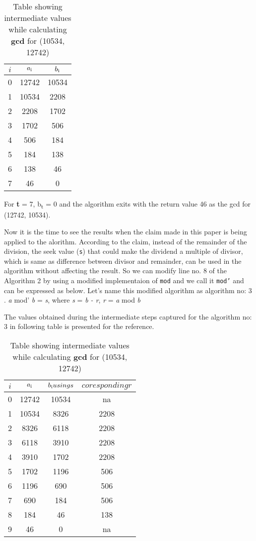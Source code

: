 \documentclass[12pt]{article}
\begin{document}
\begin{table}[h!]
\centering
	\begin{tabular}{c | c | c}
		\hline
		$i$ & $a\textsubscript{i}$ & $b\textsubscript{i}$ \\ [0.5ex] 
		\hline
		0 & 12742 & 10534 \\ 
		1 & 10534 & 2208 \\  
		2 & 2208  & 1702 \\
		3 & 1702  & 506 \\
		4 & 506   & 184 \\
		5 & 184   & 138 \\
		6 & 138   & 46 \\
		7 & 46    & 0
	\end{tabular}
\caption{Table showing intermediate values while calculating \textbf{gcd} for (10534, 12742)}
\label{table:2}
\end{table}

For \textbf{t} = 7, b\textsubscript{t} = 0 and the algorithm exits with the return value 
46 as the gcd for (12742, 10534).

Now it is the time to see the results when the claim made in this paper is being applied 
to the alorithm. According to the claim, instead of the remainder of the division, the seek value (\texttt{s}) that could make the dividend a multiple of divisor, which is same as difference between divisor and remainder, can be used in the algorithm without affecting the result. So we can modify line no. 8 of the Algorithm 2 by using a modified implementaion of \texttt{mod} and we call it \texttt{mod'} and can be expressed as below. Let's name this modified algorithm as algorithm no: 3 .  \linebreak
\textit{a} mod' \textit{b} = \textit{s}, where  \textit{s} = \textit{b - r}, \textit{r} = \textit{a} mod \textit{b}

The values obtained during the intermediate steps captured for the algorithm no: 3 in following table is presented for the reference.

\begin{table}[h!]
\centering
	\begin{tabular}{c | c | c | c}
		\hline
		$i$ & $a\textsubscript{i}$ & $b\textsubscript{i} using s$ & $coresponding r$\\ [0.5ex] 
		\hline
		0 & 12742 & 10534 & na  \\ 
		1 & 10534 & 8326  & 2208\\  
		2 & 8326  & 6118  & 2208\\
		3 & 6118  & 3910  & 2208\\
		4 & 3910   & 1702 & 2208\\
		5 & 1702   & 1196 & 506\\
		6 & 1196   & 690  & 506\\
		7 & 690    & 184  & 506\\
		8 & 184    & 46   & 138\\
		9 & 46     & 0    & na
	\end{tabular}
\caption{Table showing intermediate values while calculating \textbf{gcd} for (10534, 12742)}
\label{table:3}
\end{table}
\end{document}
